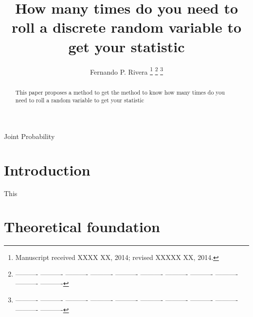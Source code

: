 \documentclass[journal]{IEEEtran}
\begin{document}
\title{How many times do you need to roll a discrete random variable to get your statistic }


\author{Fernando P. Rivera 
\thanks{Manuscript received XXXX XX, 2014; revised XXXXX XX, 2014.}
\thanks{---------- ---------- ---------- ---------- ---------- ---------- ---------- ---------- ---------- ---------- ---------- }%
\thanks{---------- ---------- ---------- ---------- ---------- ---------- ---------- ---------- ---------- ---------- ---------- }}%


\maketitle


\begin{abstract}
This paper proposes a method to get the method to know
how many times do you need to roll a random variable to get your statistic

\end{abstract}

\begin{keywords}
Joint Probability
\end{keywords}

\IEEEpeerreviewmaketitle
\section{Introduction}
\label{sec:Intro}
 This
\section{Theoretical foundation} 
\label{sec:theoretical}
\end{document}
